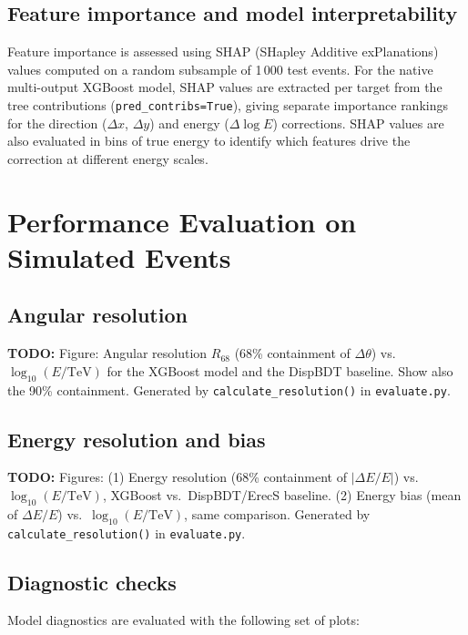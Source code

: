 \documentclass[12pt]{article}
\newcommand{\todo}[1]{\begin{hintBox} \textbf{TODO:} #1 \end{hintBox}}
\begin{document}
\subsection{Feature importance and model interpretability}

Feature importance is assessed using SHAP (SHapley Additive exPlanations) values
computed on a random subsample of 1\,000 test events.
For the native multi-output XGBoost model, SHAP values are extracted per target
from the tree contributions (\texttt{pred\_contribs=True}),
giving separate importance rankings for the direction
($\Delta x$, $\Delta y$) and energy ($\Delta\log E$) corrections.
SHAP values are also evaluated in bins of true energy to identify
which features drive the correction at different energy scales.



\section{Performance Evaluation on Simulated Events}
\label{sec:performance}

\subsection{Angular resolution}

\todo{Figure: Angular resolution $R_{68}$ (68\% containment of $\Delta\theta$) vs.\ $\log_{10}(E/\mathrm{TeV})$ for the XGBoost model and the DispBDT baseline. Show also the 90\% containment.  Generated by \texttt{calculate\_resolution()} in \texttt{evaluate.py}.}

\subsection{Energy resolution and bias}

\todo{Figures: (1) Energy resolution (68\% containment of $|\Delta E/E|$) vs.\ $\log_{10}(E/\mathrm{TeV})$, XGBoost vs.\ DispBDT/ErecS baseline. (2) Energy bias (mean of $\Delta E/E$) vs.\ $\log_{10}(E/\mathrm{TeV})$, same comparison. Generated by \texttt{calculate\_resolution()} in \texttt{evaluate.py}.}

\subsection{Diagnostic checks}

Model diagnostics are evaluated with the following set of plots:
\end{document}
